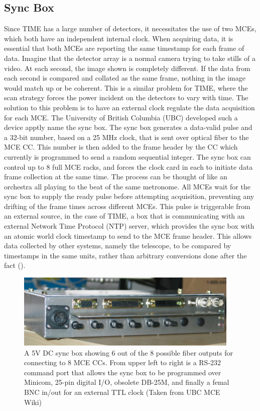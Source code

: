\documentclass[manuscript]{aastex}
\begin{document}
\subsection{Sync Box}
Since TIME has a large number of detectors, it necessitates the use of two MCEs, which both have an independent internal clock. When acquiring data, it is essential that both MCEs are reporting the same timestamp for each frame of data. Imagine that the detector array is a normal camera trying to take stills of a video. At each second, the image shown is completely different. If the data from each second is compared and collated as the same frame, nothing in the image would match up or be coherent. This is a similar problem for TIME, where the scan strategy forces the power incident on the detectors to vary with time. The solution to this problem is to have an external clock regulate the data acquisition for each MCE. The University of British Columbia (UBC) developed such a device apptly name the sync box. 
The sync box generates a data-valid pulse and a 32-bit number, based on a 25 MHz clock, that is sent over optical fiber to the MCE CC. This number is then added to the frame header by the CC which currently is programmed to send a random sequential integer. The sync box can control up to 8 full MCE racks, and forces the clock card in each to initiate data frame collection at the same time. The process can be thought of like an orchestra all playing to the beat of the same metronome. All MCEs wait for the sync box to supply the ready pulse before attempting acquisition, preventing any drifting of the frame times across different MCEs. This pulse is triggerable from an external source, in the case of TIME, a box that is communicating with an external Network Time Protocol (NTP) server, which provides the sync box with an atomic world clock timestamp to send to the MCE frame header. This allows data collected by other systems, namely the telescope, to be compared by timestamps in the same units, rather than arbitrary conversions done after the fact (\cite{Battistelli2008}).

\begin{figure}[H]
\centering
\captionsetup{width=0.95\textwidth}
\includegraphics[width=0.95\textwidth]{sync.png}
\caption[University of British Columbia Sync Box]{A 5V DC sync box showing 6 out of the 8 possible fiber outputs for connecting to 8 MCE CCs. From upper left to right is a RS-232 command port that allows the sync box to be programmed over {\sc Minicom}, 25-pin digital I/O, obsolete DB-25M, and finally a femal BNC in/out for an external TTL clock (Taken from UBC MCE Wiki)}
\label{fig:mce}
\vspace{-0.8cm}
\end{figure}
\end{document}
